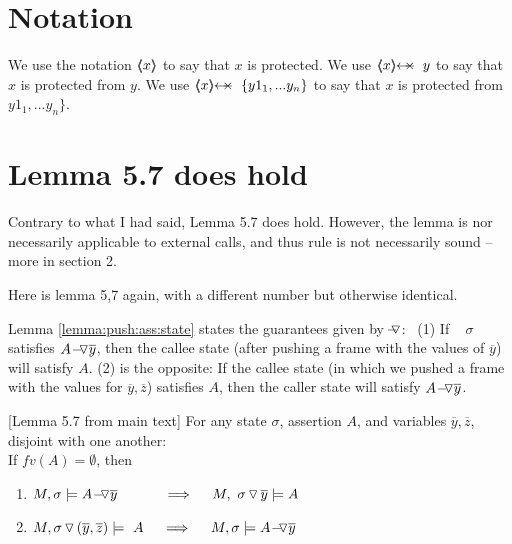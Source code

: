 \newcommand{\balance}{\prg{bal}}
\newcommand{\password}{\prg{pwd}}
\newcommand{\myAccount}{\prg{accnt}}

\section{Notation}
We use   the notation ${\inside{x}}$ to say that $x$ is protected. 
We use $\protectedFrom x y$ to say that $x$ is protected from $y$.
We use $\protectedFrom x \{ y1_1,... y_n\}$ to say that $x$ is protected from $y1_1,... y_n\}$.


\section{Lemma 5.7 does hold}

Contrary to what I had said, %
 Lemma 5.7 does hold. However, the lemma is nor necessarily applicable to external calls, and thus rule {} is not necessarily sound -- more in section 2.
 
 
 Here is lemma 5,7 again, with a different number but otherwise identical.

 Lemma \ref{lemma:push:ass:state} states the guarantees given by $\pushSymbolAA$: \  (1) If \ %
$\sigma$ satisfies  $\PushAS y A$, then   { the callee state (after pushing a frame with the values of $\overline y$) 
will satisfy $A$}. %
(2) is the opposite: {If the callee state (in which we pushed a frame with the values for $\overline y, \overline z$) satisfies $A$, then the
caller state will satisfy 
$\PushAS {y} {A}$. } %

\begin{lemma} 
\label{lemma:push:ass:state}[Lemma 5.7 from main text]
For any state  $\sigma$, assertion $A$, and variables   $\overline y, \overline z$, disjoint with one another:
\\
If  $fv(A)=\emptyset$, then
\begin{enumerate}
 \item
 \label{lemma:push:ass:state:one}
$M, \sigma \models \PushAS {y} {A}\ \ \ \ \ \ \  \ \ \    \Longrightarrow  \ \ \ \ M,  \PushS {y} {\sigma}   \models A$
\item
\label{lemma:push:ass:state:two}
$M, { \PushSLong {(\overline y, \overline z)} {\sigma} } \models\  A \  \ \ \ \Longrightarrow  \ \ \ \ M,  \sigma \models  \PushAS  {y} {A}$
\end{enumerate}
\end{lemma}


